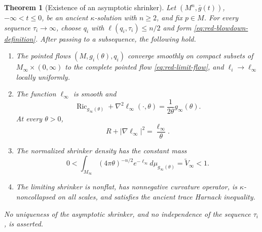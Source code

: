 \documentclass[10pt]{coll-l}
\newtheorem{theorem}{Theorem}[chapter]
\theoremstyle{definition}
\theoremstyle{remark}
\numberwithin{section}{chapter}
\numberwithin{equation}{chapter}
\newcommand{\Ric}{\operatorname{Ric}}
\begin{document}
\begin{theorem}[Existence of an asymptotic shrinker]
\label{thm:red-asymptotic-shrinker}
Let $(M^n,\bar g(t))$, $-\infty<t\leq0$, be an ancient $\kappa$-solution
with $n\geq2$,
and fix $p\in M$.  For every sequence $\tau_i\to\infty$, choose
$q_i$ with $\ell(q_i,\tau_i)\leq n/2$ and form
\eqref{eq:red-blowdown-definition}.  After passing to a subsequence, the
following hold.
\begin{enumerate}
\item The pointed flows $(M,g_i(\theta),q_i)$ converge smoothly on compact
      subsets of $M_\infty\times(0,\infty)$ to the complete pointed flow
      \eqref{eq:red-limit-flow}, and $\ell_i\to\ell_\infty$ locally
      uniformly.
\item The function $\ell_\infty$ is smooth and
\begin{equation}
 \Ric_{g_\infty(\theta)}+\nabla^2\ell_\infty(\cdot,\theta)
              =\frac1{2\theta}g_\infty(\theta).         \label{eq:red-limit-shrinker-equation}
\end{equation}
At every $\theta>0$,
\begin{equation}
 R+|\nabla\ell_\infty|^2=\frac{\ell_\infty}\theta.      \label{eq:red-limit-Hamilton-normalization}
\end{equation}
\item The normalized shrinker density has the constant mass
\begin{equation}
 0<\int_{M_\infty}(4\pi\theta)^{-n/2}e^{-\ell_\infty}
                   d\mu_{g_\infty(\theta)}
       =\widetilde V_\infty<1.                          \label{eq:red-limit-mass-strict}
\end{equation}
\item The limiting shrinker is nonflat, has nonnegative curvature operator,
      is $\kappa$-noncollapsed on all scales, and satisfies the ancient trace
      Harnack inequality.
\end{enumerate}
No uniqueness of the asymptotic shrinker, and no independence of the
sequence $\tau_i$, is asserted.
\end{theorem}
\end{document}
